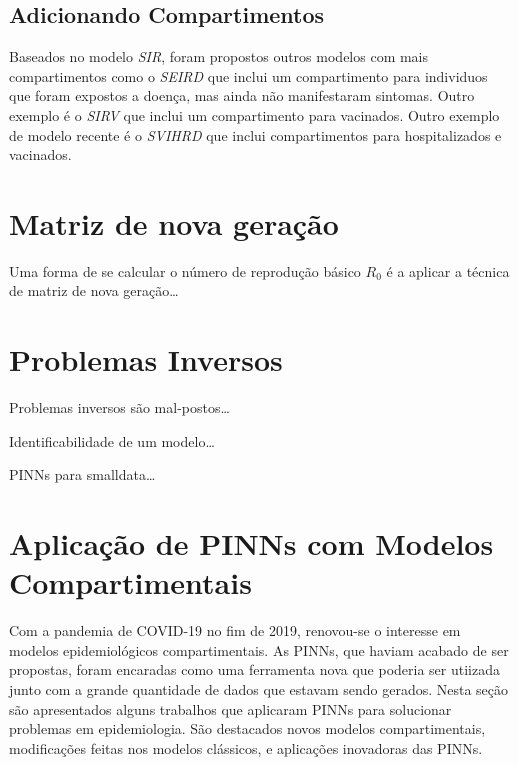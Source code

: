 \subsection{Adicionando Compartimentos}

Baseados no modelo \textit{SIR}, foram propostos outros modelos com mais 
compartimentos como o \textit{SEIRD} \cite{giles:77-sird} que inclui um 
compartimento para individuos que foram expostos a doença, mas 
ainda não manifestaram sintomas. 
Outro exemplo é o \textit{SIRV} \cite{schlickeiser-kroger:21-sirv} 
que inclui um compartimento para vacinados.
Outro exemplo de modelo recente é o \textit{SVIHRD} \cite{nelson-etal:24-japao}
que inclui compartimentos para hospitalizados e vacinados.

\section{Matriz de nova geração}

Uma forma de se calcular o número de reprodução básico $R_0$ é a aplicar a técnica
de matriz de nova geração\dots

\section{Problemas Inversos}

Problemas inversos são mal-postos\dots

Identificabilidade de um modelo\dots

PINNs para smalldata\dots

\section{Aplicação de PINNs com Modelos Compartimentais}

Com a pandemia de COVID-19 no fim de 2019, renovou-se o interesse em modelos
epidemiológicos compartimentais. As PINNs, que haviam acabado de ser propostas,
foram encaradas como uma ferramenta nova que poderia ser utiizada junto com 
a grande quantidade de dados que estavam sendo gerados. 
Nesta seção são apresentados alguns trabalhos que aplicaram PINNs para solucionar
problemas em epidemiologia. São destacados novos modelos compartimentais, 
modificações feitas nos modelos clássicos, e aplicações inovadoras das PINNs.  

